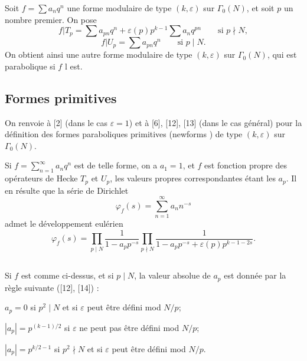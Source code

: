 \documentclass[11pt]{amsart}
\theoremstyle{plain}
\theoremstyle{definition}
\theoremstyle{remark}
\begin{document}
Soit $f = \sum a_n q^n$ une forme modulaire de type $(k,\varepsilon)$ sur $\Gamma_0(N)$, et soit $p$ un nombre premier. On pose
\begin{equation}
\label{eq:hecke1}
f|T_p = \sum a_{pn} q^n + \varepsilon(p) p^{k-1} \sum a_n q^{pn} \qquad \text{si } p \nmid N,
\end{equation}
\begin{equation}
\label{eq:hecke2}
f|U_p = \sum a_{pn} q^n \qquad \text{si } p \mid N.
\end{equation}
On obtient ainsi une autre forme modulaire de type $(k,\varepsilon)$ sur $\Gamma_0(N)$, qui est parabolique si $f$ l est.

\subsection{Formes primitives}

On renvoie à [2] (dans le cas $\varepsilon = 1$) et à [6], [12], [13] (dans le cas général) pour la définition des formes paraboliques primitives (\og newforms \fg{}) de type $(k,\varepsilon)$ sur $\Gamma_0(N)$.

Si $f = \sum_{n=1}^{\infty} a_n q^n$ est de telle forme, on a $a_1 = 1$, et $f$ est fonction propre des opérateurs de Hecke $T_p$ et $U_p$, les valeurs propres correspondantes étant les $a_p$. Il en résulte que la série de Dirichlet
\begin{equation}
\label{eq:dirichlet}
\varphi_f(s) = \sum_{n=1}^{\infty} a_n n^{-s}
\end{equation}
admet le développement eulérien
\begin{equation}
\label{eq:euler}
\varphi_f(s) = \prod_{p \mid N} \frac{1}{1-a_p p^{-s}} \prod_{p \nmid N} \frac{1}{1-a_p p^{-s} + \varepsilon(p) p^{k-1-2s}}.
\end{equation}

\subsection{}

Si $f$ est comme ci-dessus, et si $p \mid N$, la valeur absolue de $a_p$ est donnée par la règle suivante ([12], [14]) :

$a_p = 0$ si $p^2 \mid N$ et si $\varepsilon$ peut être défini mod $N/p$;

$|a_p| = p^{(k-1)/2}$ si $\varepsilon$ ne peut pas être défini mod $N/p$;

$|a_p| = p^{k/2-1}$ si $p^2 \nmid N$ et si $\varepsilon$ peut être défini mod $N/p$.
\end{document}
